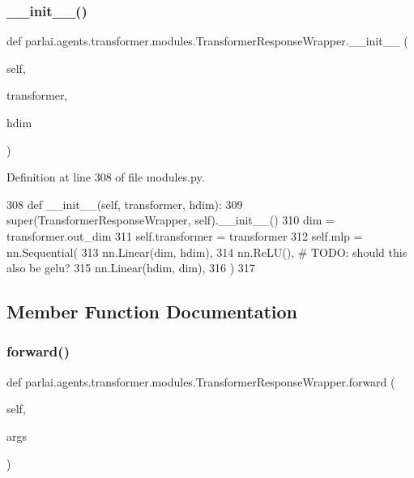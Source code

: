 \subsubsection{\texorpdfstring{\+\_\+\+\_\+init\+\_\+\+\_\+()}{\_\_init\_\_()}}
{\footnotesize\ttfamily def parlai.\+agents.\+transformer.\+modules.\+Transformer\+Response\+Wrapper.\+\_\+\+\_\+init\+\_\+\+\_\+ (\begin{DoxyParamCaption}\item[{}]{self,  }\item[{}]{transformer,  }\item[{}]{hdim }\end{DoxyParamCaption})}



Definition at line 308 of file modules.\+py.


\begin{DoxyCode}
308     \textcolor{keyword}{def }\_\_init\_\_(self, transformer, hdim):
309         super(TransformerResponseWrapper, self).\_\_init\_\_()
310         dim = transformer.out\_dim
311         self.transformer = transformer
312         self.mlp = nn.Sequential(
313             nn.Linear(dim, hdim),
314             nn.ReLU(),  \textcolor{comment}{# TODO: should this also be gelu?}
315             nn.Linear(hdim, dim),
316         )
317 
\end{DoxyCode}


\subsection{Member Function Documentation}
\mbox{\label{classparlai_1_1agents_1_1transformer_1_1modules_1_1TransformerResponseWrapper_ad716cb3a5874f46b1aa4beb45ba1b944}} 
\subsubsection{\texorpdfstring{forward()}{forward()}}
{\footnotesize\ttfamily def parlai.\+agents.\+transformer.\+modules.\+Transformer\+Response\+Wrapper.\+forward (\begin{DoxyParamCaption}\item[{}]{self,  }\item[{}]{args }\end{DoxyParamCaption})}

